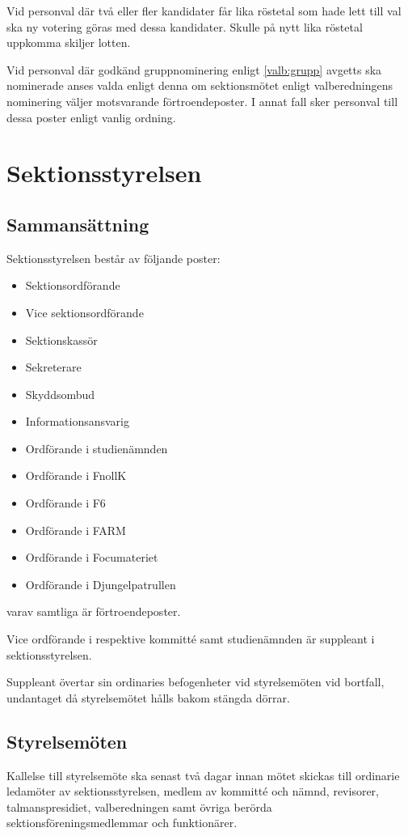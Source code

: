 \documentclass{styrdokument}
\begin{document}
\? Vid personval där två eller fler kandidater får lika röstetal som hade lett till val ska ny votering göras med dessa kandidater.
Skulle på nytt lika röstetal uppkomma skiljer lotten.

\? Vid personval där godkänd gruppnominering enligt \cref{valb:grupp} avgetts ska nominerade anses valda enligt denna om sektionsmötet enligt valberedningens nominering väljer motsvarande förtroendeposter.
I annat fall sker personval till dessa poster enligt vanlig ordning.

\section{Sektionsstyrelsen}
\subsection{Sammansättning}
\? Sektionsstyrelsen består av följande poster:
\begin{itemize}
    \item Sektionsordförande
	\item Vice sektionsordförande
	\item Sektionskassör
	\item Sekreterare
	\item Skyddsombud
	\item Informationsansvarig
	\item Ordförande i studienämnden
	\item Ordförande i FnollK
	\item Ordförande i F6
	\item Ordförande i FARM
	\item Ordförande i Focumateriet
	\item Ordförande i Djungelpatrullen
\end{itemize}
varav samtliga är förtroendeposter.
			
\? Vice ordförande i respektive kommitté samt studienämnden är suppleant i sektionsstyrelsen.
		
\? Suppleant övertar sin ordinaries befogenheter vid styrelsemöten vid bortfall, undantaget då styrelsemötet hålls bakom stängda dörrar.

\subsection{Styrelsemöten}
\? Kallelse till styrelsemöte ska senast två dagar innan mötet skickas till ordinarie ledamöter av sektionsstyrelsen, medlem av kommitté och nämnd, revisorer, talmanspresidiet, valberedningen samt övriga berörda sektionsföreningsmedlemmar och funktionärer.
		
\end{document}

